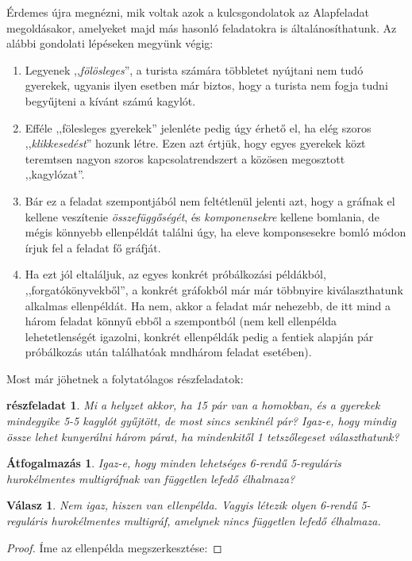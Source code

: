 \documentclass{article}
\newtheorem{subproblem}{részfeladat}
\newtheorem*{reword}{Átfogalmazás}
\newtheorem*{answer}{Válasz}
\begin{document}
	Érdemes újra megnézni, mik voltak azok a kulcsgondolatok az Alapfeladat megoldásakor, amelyeket majd más hasonló feladatokra is általánosíthatunk.
	Az alábbi gondolati lépéseken megyünk végig:
	\begin{enumerate}
		\item Legyenek ,,\emph{fölösleges}'', a turista számára többletet nyújtani nem tudó gyerekek, ugyanis ilyen esetben már biztos, hogy a turista nem fogja tudni begyűjteni a kívánt számú kagylót.
		\item Efféle ,,fölesleges gyerekek'' jelenléte pedig úgy érhető el, ha elég szoros ,,\emph{klikkesedést}'' hozunk létre. Ezen azt értjük, hogy egyes gyerekek közt teremtsen nagyon szoros kapcsolatrendszert a közösen megosztott ,,kagylózat''.
		\item Bár ez a feladat szempontjából nem feltétlenül jelenti azt, hogy a gráfnak el kellene veszítenie \emph{összefüggőségét}, és \emph{komponensekre} kellene bomlania, de mégis könnyebb ellenpéldát találni úgy, ha eleve komponsesekre bomló módon írjuk fel a feladat fő gráfját.
		\item Ha ezt jól eltaláljuk, az egyes konkrét próbálkozási példákból, ,,forgatókönyvekből'',  a konkrét gráfokból már  már többnyire kiválaszthatunk alkalmas ellenpéldát. Ha nem, akkor a feladat már nehezebb, de itt mind a három feladat könnyű ebből a szempontból (nem kell ellenpélda lehetetlenségét igazolni, konkrét ellenpéldák pedig a fentiek alapján pár próbálkozás után találhatóak mndhárom feladat esetében).
	\end{enumerate}

	Most már jöhetnek a folytatólagos részfeladatok:

	\begin{subproblem}
		Mi a helyzet akkor, ha 15 pár van a homokban, és a gyerekek mindegyike 5-5 kagylót gyűjtött, de most sincs senkinél pár? Igaz-e, hogy mindig össze lehet kunyerálni három párat, ha mindenkitől 1 tetszőlegeset választhatunk?
	\end{subproblem}
	\begin{reword}
		Igaz-e, hogy minden lehetséges 6-rendű 5-reguláris hurokélmentes multigráfnak van független lefedő élhalmaza?
	\end{reword}
	\begin{answer}
		Nem igaz, hiszen van ellenpélda. Vagyis létezik olyen 6-rendű 5-reguláris hurokélmentes multigráf, amelynek nincs független lefedő élhalmaza.
	\end{answer}
	\begin{proof}
		Íme az ellenpélda megszerkesztése:

		
	\end{proof}
\end{document}
